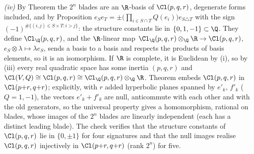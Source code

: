 \emph{(iv)} By Theorem  the $2^{n}$ blades are an $\R$-basis of $\Cl(p,q,r)$, degenerate forms included, and by Proposition  $e_{S}e_{T} = \pm\bigl(\prod_{i \in S \cap T}Q(e_{i})\bigr)e_{S \triangle T}$ with the sign $(-1)^{\#\{(i,j) \in S \times T : i > j\}}$: the structure constants lie in $\{0, 1, -1\} \subset \Q$. They define $\Cl_{\Q}(p,q,r)$, and the $\R$-linear map $\Cl_{\Q}(p,q,r) \otimes_{\Q} \R \to \Cl(p,q,r)$, $e_{S} \otimes \lambda \mapsto \lambda e_{S}$, sends a basis to a basis and respects the products of basis elements, so it is an isomorphism. If $\R$ is complete, it is Euclidean by (i), so by (iii) every real quadratic space has some inertia $(p, q, r)$ and $\Cl(V, Q) \cong \Cl(p,q,r) \cong \Cl_{\Q}(p,q,r) \otimes_{\Q} \R$. Theorem  embeds $\Cl(p,q,r)$ in $\Cl(p{+}r, q{+}r)$; explicitly, with $r$ added hyperbolic planes spanned by $e'_{k}$, $f'_{k}$ ($Q = 1, -1$), the vectors $e'_{k} + f'_{k}$ are null, anticommute with each other and with the old generators, so the universal property gives a homomorphism, rational on blades, whose images of the $2^{n}$ blades are linearly independent (each has a distinct leading blade). The check verifies that the structure constants of $\Cl(p,q,r)$ lie in $\{0, \pm 1\}$ for four signatures and that the null images realise $\Cl(p,q,r)$ injectively in $\Cl(p{+}r, q{+}r)$ (rank $2^{n}$) for five.

